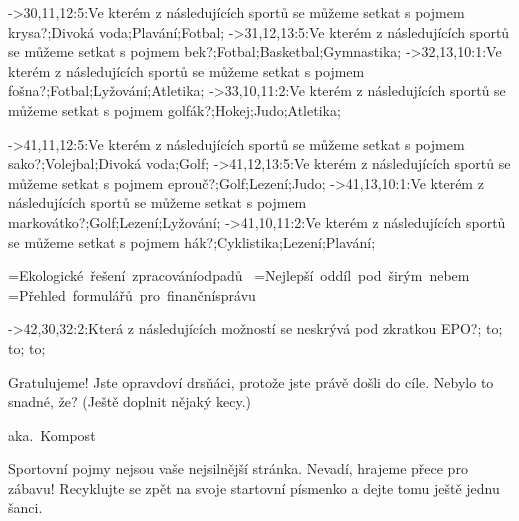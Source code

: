 ->30,11,12:5:Ve kterém z následujících sportů se může\-me setkat s pojmem {\questionfontit krysa}?;Divoká voda;Plavání;Fotbal;%
->31,12,13:5:Ve kterém z následujících sportů se může\-me setkat s pojmem {\questionfontit bek}?;Fotbal;Basketbal;Gymnastika;%
->32,13,10:1:Ve kterém z následujících sportů se může\-me setkat s pojmem {\questionfontit fošna}?;Fotbal;Lyžování;Atletika;%
->33,10,11:2:Ve kterém z následujících sportů se může\-me setkat s pojmem {\questionfontit golfák}?;Hokej;Judo;Atletika;%

->41,11,12:5:Ve kterém z následujících sportů se může\-me setkat s pojmem {\questionfontit sako}?;Volejbal;Divoká voda;Golf;%
->41,12,13:5:Ve kterém z následujících sportů se může\-me setkat s pojmem {\questionfontit eprouč}?;Golf;Lezení;Judo;%
->41,13,10:1:Ve kterém z následujících sportů se může\-me setkat s pojmem {\questionfontit markovátko}?;Golf;Lezení;Lyžování;%
->41,10,11:2:Ve kterém z následujících sportů se může\-me setkat s pojmem {\questionfontit hák}?;Cyklistika;Lezení;Plavání;%

=\vbox{\questionfont\baselineskip=40pt\hbox{Ekologické řešení zpracování}\hbox{odpadů}\hbox{~}}
=\vbox{\questionfont\baselineskip=40pt\hbox{Nejlepší oddíl pod širým nebem}\hbox{~}}
=\vbox{\questionfont\baselineskip=40pt\hbox{Přehled formulářů pro finanční}\hbox{správu}\hbox{~}}

->42,30,32:2:Která z následujících možností se {\questionfontit neskrý\-vá} pod zkratkou {\questionfontit EPO}?;{ \vbox to};{ \vbox to};{ \vbox to};%


%


%
%
\centerline{\topletterfont{}}
\vskip2cm
\baselineskip=50pt
{\finishfont\hskip1.8cm Gratulujeme! Jste opravdoví drs\-ňá\-ci, protože jste právě došli do cíle. Nebylo to snadné, že? (Ještě doplnit nějaký kecy.)}
\footing


%
%
\centerline{\topletterfont{}}
\vskip2cm
\centerline{\kompostfont aka.\ Kompost}
\vskip2cm
\baselineskip=50pt
{\finishfont\hskip1.8cm  Sportovní pojmy nejsou vaše nej\-sil\-nější stránka. Nevadí, hra\-je\-me přece pro zábavu! Re\-cyk\-luj\-te se zpět na svoje startovní písmenko a dejte tomu ještě jed\-nu šanci.}
\footing


%
%
\bye
